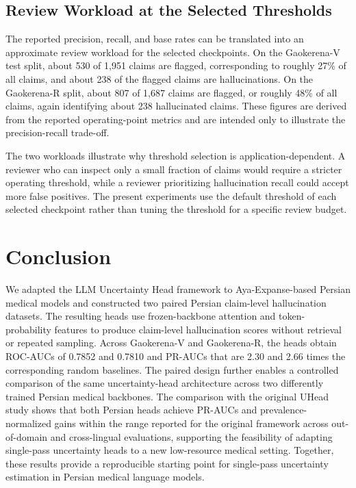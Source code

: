 \documentclass[conference]{IEEEtran}
\begin{document}
\subsection{Review Workload at the Selected Thresholds}

The reported precision, recall, and base rates can be translated into an approximate review workload for the selected checkpoints. On the Gaokerena-V test split, about 530 of 1,951 claims are flagged, corresponding to roughly 27\% of all claims, and about 238 of the flagged claims are hallucinations. On the Gaokerena-R split, about 807 of 1,687 claims are flagged, or roughly 48\% of all claims, again identifying about 238 hallucinated claims. These figures are derived from the reported operating-point metrics and are intended only to illustrate the precision-recall trade-off.

The two workloads illustrate why threshold selection is application-dependent. A reviewer who can inspect only a small fraction of claims would require a stricter operating threshold, while a reviewer prioritizing hallucination recall could accept more false positives. The present experiments use the default threshold of each selected checkpoint rather than tuning the threshold for a specific review budget.

\section{Conclusion}

We adapted the LLM Uncertainty Head framework to Aya-Expanse-based Persian medical models and constructed two paired Persian claim-level hallucination datasets. The resulting heads use frozen-backbone attention and token-probability features to produce claim-level hallucination scores without retrieval or repeated sampling. Across Gaokerena-V and Gaokerena-R, the heads obtain ROC-AUCs of 0.7852 and 0.7810 and PR-AUCs that are 2.30 and 2.66 times the corresponding random baselines. The paired design further enables a controlled comparison of the same uncertainty-head architecture across two differently trained Persian medical backbones. The comparison with the original UHead study shows that both Persian heads achieve PR-AUCs and prevalence-normalized gains within the range reported for the original framework across out-of-domain and cross-lingual evaluations, supporting the feasibility of adapting single-pass uncertainty heads to a new low-resource medical setting. Together, these results provide a reproducible starting point for single-pass uncertainty estimation in Persian medical language models.
\end{document}

